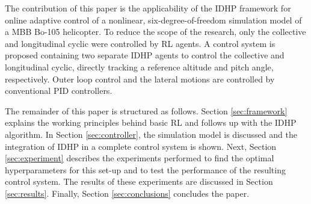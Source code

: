 The contribution of this paper is the applicability of the IDHP framework for online adaptive control of a nonlinear, six-degree-of-freedom simulation model of a MBB Bo-105 helicopter. To reduce the scope of the research, only the collective and longitudinal cyclic were controlled by RL agents. A control system is proposed containing two separate IDHP agents to control the collective and longitudinal cyclic, directly tracking a reference altitude and pitch angle, respectively. Outer loop control and the lateral motions are controlled by conventional PID controllers. 

The remainder of this paper is structured as follows. Section \ref{sec:framework} explains the working principles behind basic RL and follows up with the IDHP algorithm. In Section \ref{sec:controller}, the simulation model is discussed and the integration of IDHP in a complete control system is shown. Next, Section \ref{sec:experiment} describes the experiments performed to find the optimal hyperparameters for this set-up and to test the performance of the resulting control system. The results of these experiments are discussed in Section \ref{sec:results}. Finally, Section \ref{sec:conclusions} concludes the paper. 